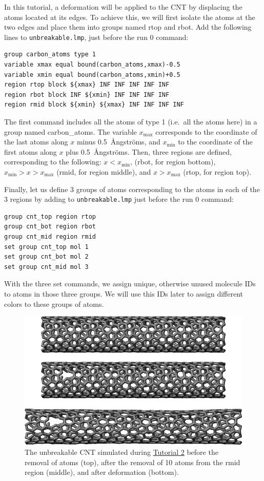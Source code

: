 \documentclass[9pt,tutorial]{livecoms}
\newcommand{\lmpcmd}[1]{\hspace{0pt}\colorbox{listing}{\textcolor{command}{\small{#1}}}\hspace{0pt}} %
\newcommand{\flecmd}[1]{\textcolor{command}{\texttt{#1}}} %
\begin{document}
In this tutorial, a deformation will be applied to the CNT by displacing
the atoms located at its edges.  To achieve this, we will first isolate the
atoms at the two edges and place them into groups named \lmpcmd{rtop} and
\lmpcmd{rbot}.  Add the following lines to \flecmd{unbreakable.lmp},
just before the \lmpcmd{run 0} command:
\begin{lstlisting}
group carbon_atoms type 1
variable xmax equal bound(carbon_atoms,xmax)-0.5
variable xmin equal bound(carbon_atoms,xmin)+0.5
region rtop block ${xmax} INF INF INF INF INF
region rbot block INF ${xmin} INF INF INF INF
region rmid block ${xmin} ${xmax} INF INF INF INF
\end{lstlisting}
The first command includes all the atoms of type 1 (i.e.~all the atoms here)
in a group named \lmpcmd{carbon\_atoms}.
The variable $x_\text{max}$ corresponds to the coordinate of the
last atoms along $x$ minus 0.5~Ångströms, and $x_\text{min}$ to the coordinate
of the first atoms along $x$ plus 0.5~Ångströms.  Then, three regions are defined,
corresponding to the following: $x < x_\text{min}$, (\lmpcmd{rbot}, for region
bottom), $x_\text{min} > x > x_\text{max}$ (\lmpcmd{rmid}, for region middle),
and $x > x_\text{max}$ (\lmpcmd{rtop}, for region top).

Finally, let us define 3 groups of atoms corresponding to the atoms
in each of the 3 regions by adding to \flecmd{unbreakable.lmp}
just before the \lmpcmd{run 0} command:
\begin{lstlisting}
group cnt_top region rtop
group cnt_bot region rbot
group cnt_mid region rmid
set group cnt_top mol 1
set group cnt_bot mol 2
set group cnt_mid mol 3
\end{lstlisting}
With the three \lmpcmd{set} commands, we assign unique, otherwise unused
molecule IDs to atoms in those three groups.  We will use this IDs later to
assign different colors to these groups of atoms.

\begin{figure}
\centering
\includegraphics[width=\linewidth]{CNT-unbreakable}
\caption{The unbreakable CNT simulated during \hyperref[carbon-nanotube-label]{Tutorial 2}
before the removal of atoms (top), after the removal of 10 atoms from the \lmpcmd{rmid}
region (middle), and after deformation (bottom).}
\label{fig:CNT-unbreakable}
\end{figure}
\end{document}
